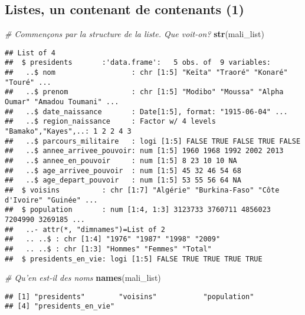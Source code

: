 \documentclass[]{book}
\newenvironment{Shaded}{\begin{snugshade}}{\end{snugshade}}
\newcommand{\KeywordTok}[1]{\textcolor[rgb]{0.13,0.29,0.53}{\textbf{#1}}}
\newcommand{\CommentTok}[1]{\textcolor[rgb]{0.56,0.35,0.01}{\textit{#1}}}
\newcommand{\NormalTok}[1]{#1}
\begin{document}
\normalsize

\subsection{Listes, un contenant de contenants
(1)}\label{listes-un-contenant-de-contenants-1}

\tiny

\begin{Shaded}
\begin{Highlighting}[]
\CommentTok{# Commençons par la structure de la liste. Que voit-on?}
\KeywordTok{str}\NormalTok{(mali_list)}
\end{Highlighting}
\end{Shaded}

\begin{verbatim}
## List of 4
##  $ presidents       :'data.frame':   5 obs. of  9 variables:
##   ..$ nom                  : chr [1:5] "Keïta" "Traoré" "Konaré" "Touré" ...
##   ..$ prenom               : chr [1:5] "Modibo" "Moussa" "Alpha Oumar" "Amadou Toumani" ...
##   ..$ date_naissance       : Date[1:5], format: "1915-06-04" ...
##   ..$ region_naissance     : Factor w/ 4 levels "Bamako","Kayes",..: 1 2 2 4 3
##   ..$ parcours_militaire   : logi [1:5] FALSE TRUE FALSE TRUE FALSE
##   ..$ annee_arrivee_pouvoir: num [1:5] 1960 1968 1992 2002 2013
##   ..$ annee_en_pouvoir     : num [1:5] 8 23 10 10 NA
##   ..$ age_arrivee_pouvoir  : num [1:5] 45 32 46 54 68
##   ..$ age_depart_pouvoir   : num [1:5] 53 55 56 64 NA
##  $ voisins          : chr [1:7] "Algérie" "Burkina-Faso" "Côte d'Ivoire" "Guinée" ...
##  $ population       : num [1:4, 1:3] 3123733 3760711 4856023 7204990 3269185 ...
##   ..- attr(*, "dimnames")=List of 2
##   .. ..$ : chr [1:4] "1976" "1987" "1998" "2009"
##   .. ..$ : chr [1:3] "Hommes" "Femmes" "Total"
##  $ presidents_en_vie: logi [1:5] FALSE TRUE TRUE TRUE TRUE
\end{verbatim}

\begin{Shaded}
\begin{Highlighting}[]
\CommentTok{# Qu'en est-il des noms}
\KeywordTok{names}\NormalTok{(mali_list)}
\end{Highlighting}
\end{Shaded}

\begin{verbatim}
## [1] "presidents"        "voisins"           "population"       
## [4] "presidents_en_vie"
\end{verbatim}
\end{document}
